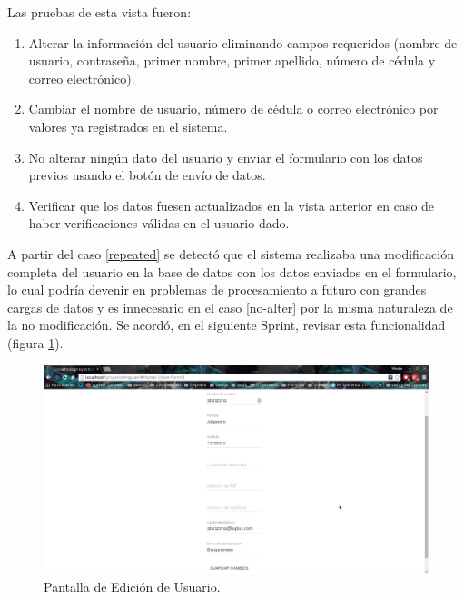     Las pruebas de esta vista fueron:
    \begin{enumerate}
        \item\label{required} Alterar la información del usuario eliminando campos requeridos (nombre de usuario, contraseña, primer nombre, primer apellido, número de cédula y correo electrónico).
        \item\label{repeated} Cambiar el nombre de usuario, número de cédula o correo electrónico por valores ya registrados en el sistema.
        \item\label{no-alter} No alterar ningún dato del usuario y enviar el formulario con los datos previos usando el botón de envío de datos.
        \item\label{details} Verificar que los datos fuesen actualizados en la vista anterior en caso de haber verificaciones válidas en el usuario dado.
    \end{enumerate}
    
    A partir del caso \ref{repeated} se detectó que el sistema realizaba una modificación completa del usuario en la base de datos con los datos enviados en el formulario, lo cual podría devenir en problemas de procesamiento a futuro con grandes cargas de datos y es innecesario en el caso \ref{no-alter} por la misma naturaleza de la no modificación. Se acordó, en el siguiente Sprint, revisar esta funcionalidad (figura \ref{Edición}).
    
    \begin{figure}[htbp!]
        \begin{center}
            \includegraphics[width=.9\textwidth]{figures/p5}
        \end{center}
        \caption{Pantalla de Edición de Usuario.}
        \label{Edición}
    \end{figure}
    
